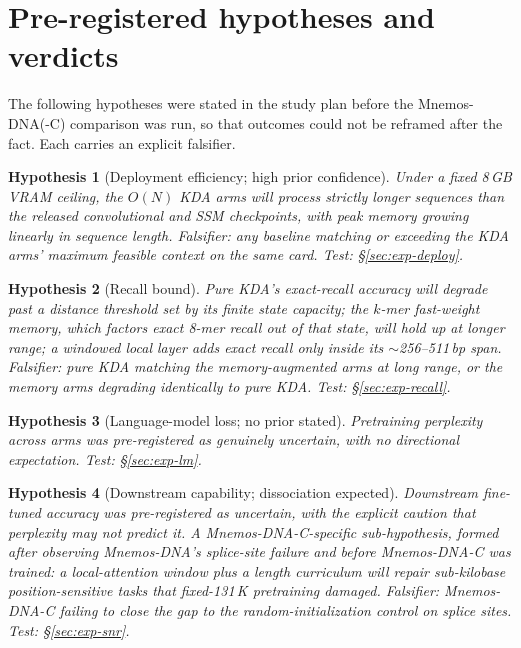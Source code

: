 \documentclass[11pt]{article}
\theoremstyle{plain}
\newtheorem{hypothesis}{Hypothesis}
\begin{document}
\appendix

\section{Pre-registered hypotheses and verdicts}\label{sec:hyp}

The following hypotheses were stated in the study plan before the Mnemos-DNA(-C) comparison was run, so
that outcomes could not be reframed after the fact. Each carries an explicit falsifier.

\begin{hypothesis}[Deployment efficiency; high prior confidence]\label{hyp:eff}
Under a fixed 8\,GB VRAM ceiling, the $O(N)$ KDA arms will process strictly longer sequences than
the released convolutional and SSM checkpoints, with peak memory growing linearly in sequence
length. \emph{Falsifier:} any baseline matching or exceeding the KDA arms' maximum feasible
context on the same card. \emph{Test:} \S\ref{sec:exp-deploy}.
\end{hypothesis}

\begin{hypothesis}[Recall bound]\label{hyp:recall}
Pure KDA's exact-recall accuracy will degrade past a distance threshold set by its finite state
capacity; the $k$-mer fast-weight memory, which factors exact 8-mer recall out of that state,
will hold up at longer range; a windowed local layer adds exact recall only inside its
$\sim$256--511\,bp span. \emph{Falsifier:} pure KDA matching the memory-augmented arms at long
range, or the memory arms degrading identically to pure KDA. \emph{Test:} \S\ref{sec:exp-recall}.
\end{hypothesis}

\begin{hypothesis}[Language-model loss; no prior stated]\label{hyp:ppl}
Pretraining perplexity across arms was pre-registered as genuinely uncertain, with no directional
expectation. \emph{Test:} \S\ref{sec:exp-lm}.
\end{hypothesis}

\begin{hypothesis}[Downstream capability; dissociation expected]\label{hyp:down}
Downstream fine-tuned accuracy was pre-registered as uncertain, with the explicit caution that
perplexity may not predict it. A Mnemos-DNA-C-specific sub-hypothesis, formed after observing Mnemos-DNA's
splice-site failure and before Mnemos-DNA-C was trained: a local-attention window plus a length curriculum
will repair sub-kilobase position-sensitive tasks that fixed-131\,K pretraining damaged.
\emph{Falsifier:} Mnemos-DNA-C failing to close the gap to the random-initialization control on splice
sites. \emph{Test:} \S\ref{sec:exp-snr}.
\end{hypothesis}
\end{document}
